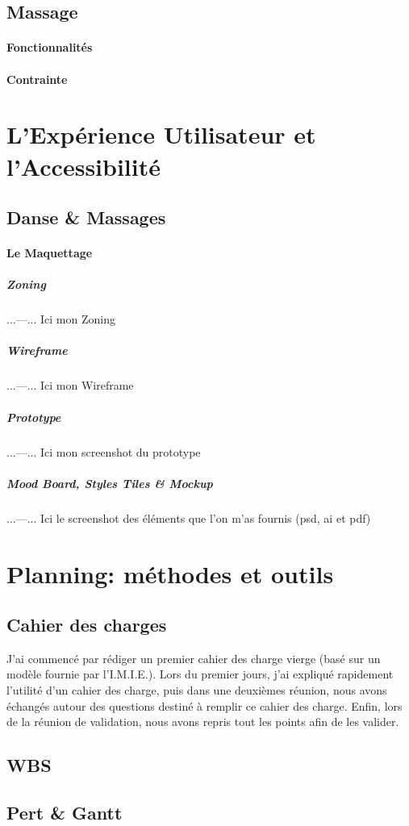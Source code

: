 \documentclass[11pt,a4paper]{report}
\begin{document}
		\subsection{Massage}
			\paragraph{Fonctionnalités}
			\paragraph{Contrainte}
	\section{L'Expérience Utilisateur et l'Accessibilité}
		\subsection{Danse \& Massages}
			\paragraph{Le Maquettage}
				\subparagraph{Zoning}
					...---... Ici mon Zoning
				\subparagraph{Wireframe}
					...---... Ici mon Wireframe
				\subparagraph{Prototype}
					...---... Ici mon screenshot du prototype
				\subparagraph{Mood Board, Styles Tiles \& Mockup}
					...---... Ici le screenshot des éléments que l'on m'as fournis (psd, ai et pdf)
	\section{Planning: méthodes et outils}
		\subsection{Cahier des charges}
			J'ai commencé par rédiger un premier cahier des charge vierge (basé sur un modèle fournie par l'I.M.I.E.). Lors du premier jours, j'ai expliqué rapidement l'utilité d'un cahier des charge, puis dans une deuxièmes réunion, nous avons échangés autour des questions destiné à remplir ce cahier des charge. Enfin, lors de la réunion de validation, nous avons repris tout les points afin de les valider.
		\subsection{WBS}
		\subsection{Pert \& Gantt}
\end{document}
